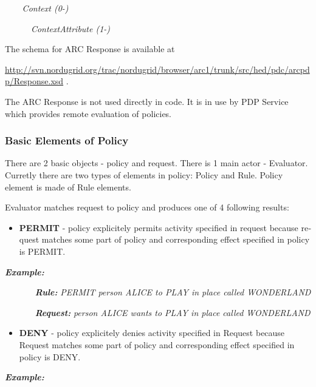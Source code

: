 \documentclass[a4paper]{article}
\newcommand\liststyleWWviiiNumxxi{%
\renewcommand\labelitemi{[F0B7?]}
\renewcommand\labelitemii{o}
\renewcommand\labelitemiii{[F0A7?]}
\renewcommand\labelitemiv{[F0B7?]}
}
\begin{document}
{\itshape\color{black}
\ \ \ \ Context (0-)}

{\itshape\color{black}
\ \ \ \ \ \ ContextAttribute (1-)}

{\upshape\color{black}
The schema for ARC Response is available at}

{\upshape\color{black}
\url{http://svn.nordugrid.org/trac/nordugrid/browser/arc1/trunk/src/hed/pdc/arcpdp/Response.xsd}
.}

{\upshape\color{black}
The ARC Response is not used directly in code. It is in use by PDP
Service which provides remote evaluation of policies. }

\subsubsection{Basic Elements of Policy}
{\color{black}
There are 2 basic objects - {\textquotedbl}policy{\textquotedbl} and
{\textquotedbl}request{\textquotedbl}. There is 1 main actor -
Evaluator. Curretly there are two types of elements in policy: Policy
and Rule. Policy element is made of Rule elements.}

{\color{black}
Evaluator matches request to policy and produces one of 4 following
results:}

\liststyleWWviiiNumxxi
\begin{itemize}
\item {\color{black}
\foreignlanguage{english}{\textbf{PERMIT}}\foreignlanguage{english}{ -
policy explicitely permits activity specified in request because
request matches some part of policy and corresponding effect specified
in policy is PERMIT. }}
\end{itemize}
{\bfseries\itshape\color{black}
Example: }

{\upshape\color{black}
\foreignlanguage{english}{\textbf{\textit{\ \ \ \ \ \ Rule:
}}}\foreignlanguage{english}{\textit{PERMIT person ALICE to PLAY in
place called WONDERLAND}}}

{\upshape\color{black}
\foreignlanguage{english}{\textbf{\textit{\ \ \ \ \ \ Request:
}}}\foreignlanguage{english}{\textit{person ALICE wants to PLAY in
place called WONDERLAND}}}

\liststyleWWviiiNumxxi
\begin{itemize}
\item {\color{black}
\foreignlanguage{english}{\textbf{DENY}}\foreignlanguage{english}{ -
policy explicitely denies activity specified in Request because Request
matches some part of policy and corresponding effect specified in
policy is DENY.}}
\end{itemize}
{\bfseries\itshape\color{black}
Example:}
\end{document}
